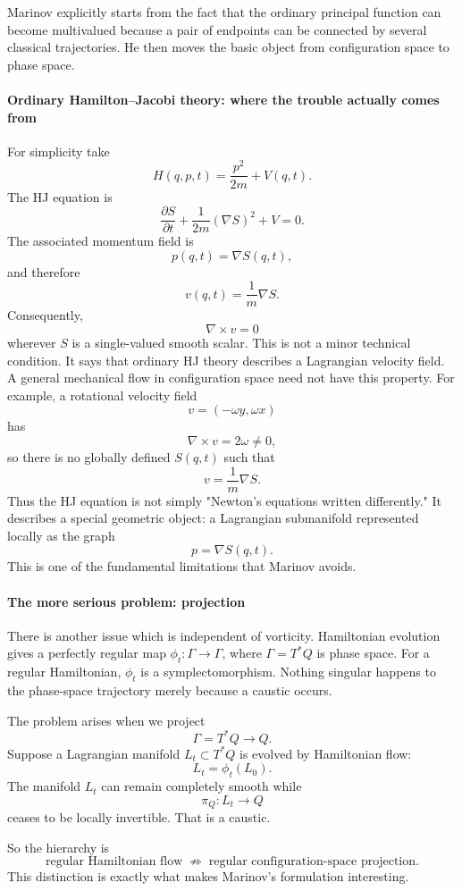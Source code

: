 Marinov explicitly starts from the fact that the ordinary principal function
can become multivalued because a pair of endpoints can be connected by several
classical trajectories. He then moves the basic object from configuration space
to phase space.

\paragraph{ Ordinary Hamilton–Jacobi theory: where the trouble actually comes from}
For simplicity take
$$ H(q,p,t)=\frac{p^2}{2m}+V(q,t). $$
The HJ equation is
$$ \frac{\partial S}{\partial t} + \frac{1}{2m}(\nabla S)^2+V=0. $$
The associated momentum field is
$$ p(q,t)=\nabla S(q,t), $$
and therefore
$$ v(q,t)=\frac{1}{m}\nabla S. $$
Consequently,
$$ \nabla\times v=0 $$
wherever \(S\) is a single-valued smooth scalar.
This is not a minor technical condition. It says that ordinary HJ theory
describes a Lagrangian velocity field.
A general mechanical flow in configuration space need not have this property.
For example, a rotational velocity field
$$ v=(-\omega y,\omega x) $$
has
$$ \nabla\times v=2\omega\neq0, $$
so there is no globally defined \(S(q,t)\) such that
$$ v=\frac{1}{m}\nabla S. $$
Thus the HJ equation is not simply "Newton's equations written differently." It
describes a special geometric object: a Lagrangian submanifold represented
locally as the graph
$$ p=\nabla S(q,t). $$
This is one of the fundamental limitations that Marinov avoids.

\paragraph{ The more serious problem: projection}
There is another issue which is independent of vorticity.
Hamiltonian evolution gives a perfectly regular map
$ \phi_t:\Gamma\rightarrow\Gamma$, where \(\Gamma=T^*Q\) is phase space.
For a regular Hamiltonian, $ \phi_t $ is a symplectomorphism.
Nothing singular happens to the phase-space trajectory merely because a caustic
occurs.

The problem arises when we project
$$ \Gamma=T^*Q\longrightarrow Q. $$
Suppose a Lagrangian manifold \(L_t\subset T^*Q\) is evolved by Hamiltonian
flow:
$$ L_t=\phi_t(L_0). $$
The manifold \(L_t\) can remain completely smooth while
$$ \pi_Q:L_t\rightarrow Q $$
ceases to be locally invertible.
That is a caustic.

So the hierarchy is
$$ \boxed{ \text{regular Hamiltonian flow} \;\not\Rightarrow\; \text{regular configuration-space projection}. } $$
This distinction is exactly what makes Marinov's formulation interesting.

